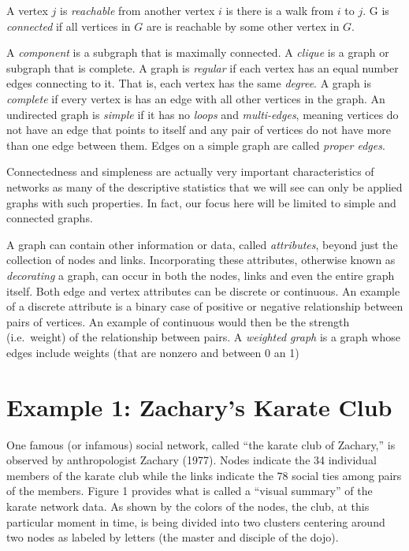\documentclass[12pt,twoside]{amherstthesis}
\begin{document}
  A vertex \(j\) is \emph{reachable} from another vertex \(i\) is there is
  a walk from \(i\) to \(j\). G is \emph{connected} if all vertices in
  \(G\) are is reachable by some other vertex in \(G\).
  
  A \emph{component} is a subgraph that is maximally connected. A
  \emph{clique} is a graph or subgraph that is complete. A graph is
  \emph{regular} if each vertex has an equal number edges connecting to
  it. That is, each vertex has the same \emph{degree}. A graph is
  \emph{complete} if every vertex is has an edge with all other vertices
  in the graph. An undirected graph is \emph{simple} if it has no
  \emph{loops} and \emph{multi-edges}, meaning vertices do not have an
  edge that points to itself and any pair of vertices do not have more
  than one edge between them. Edges on a simple graph are called
  \emph{proper edges}.
  
  Connectedness and simpleness are actually very important characteristics
  of networks as many of the descriptive statistics that we will see can
  only be applied graphs with such properties. In fact, our focus here
  will be limited to simple and connected graphs.
  
  A graph can contain other information or data, called \emph{attributes},
  beyond just the collection of nodes and links. Incorporating these
  attributes, otherwise known as \emph{decorating} a graph, can occur in
  both the nodes, links and even the entire graph itself. Both edge and
  vertex attributes can be discrete or continuous. An example of a
  discrete attribute is a binary case of positive or negative relationship
  between pairs of vertices. An example of continuous would then be the
  strength (i.e.~weight) of the relationship between pairs. A
  \emph{weighted graph} is a graph whose edges include weights (that are
  nonzero and between 0 an 1)
  
  \section{Example 1: Zachary's Karate
  Club}\label{example-1-zacharys-karate-club}
  
  One famous (or infamous) social network, called ``the karate club of
  Zachary,'' is observed by anthropologist Zachary (1977). Nodes indicate
  the 34 individual members of the karate club while the links indicate
  the 78 social ties among pairs of the members. Figure 1 provides what is
  called a ``visual summary'' of the karate network data. As shown by the
  colors of the nodes, the club, at this particular moment in time, is
  being divided into two clusters centering around two nodes as labeled by
  letters (the master and disciple of the dojo).
  
\end{document}
